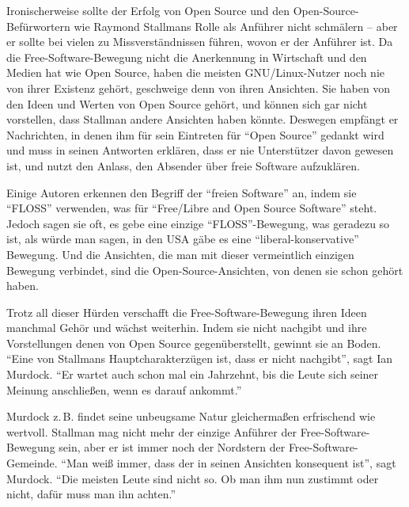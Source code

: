 Ironischerweise sollte der Erfolg von Open Source und den Open-Source-Befürwortern wie Raymond Stallmans Rolle als Anführer nicht schmälern – aber er sollte bei vielen zu Missverständnissen führen, wovon er der Anführer ist. Da die Free-Software-Bewegung nicht die Anerkennung in Wirtschaft und den Medien hat wie Open Source, haben die meisten GNU/Linux-Nutzer noch nie von ihrer Existenz gehört, geschweige denn von ihren Ansichten. Sie haben von den Ideen und Werten von Open Source gehört, und können sich gar nicht vorstellen, dass Stallman andere Ansichten haben könnte. Deswegen empfängt er Nachrichten, in denen ihm für sein Eintreten für "`Open Source"' gedankt wird und muss in seinen Antworten erklären, dass er nie Unterstützer davon gewesen ist, und nutzt den Anlass, den Absender über freie Software aufzuklären.

Einige Autoren erkennen den Begriff der "`freien Software"' an, indem sie "`FLOSS"' verwenden, was für "`Free/Libre and Open Source Software"' steht. Jedoch sagen sie oft, es gebe eine einzige "`FLOSS"'-Bewegung, was geradezu so ist, als würde man sagen, in den USA gäbe es eine "`liberal-konservative"' Bewegung. Und die Ansichten, die man mit dieser vermeintlich einzigen Bewegung verbindet, sind die Open-Source-Ansichten, von denen sie schon gehört haben.

Trotz all dieser Hürden verschafft die Free-Software-Bewegung ihren Ideen manchmal Gehör und wächst weiterhin. Indem sie nicht nachgibt und ihre Vorstellungen denen von Open Source gegenüberstellt, gewinnt sie an Boden. "`Eine von Stallmans Hauptcharakterzügen ist, dass er nicht nachgibt"', sagt Ian Murdock. "`Er wartet auch schon mal ein Jahrzehnt, bis die Leute sich seiner Meinung anschließen, wenn es darauf ankommt."'

Murdock z.\,B. findet seine unbeugsame Natur gleichermaßen erfrischend wie wertvoll. Stallman mag nicht mehr der einzige Anführer der Free-Software-Bewegung sein, aber er ist immer noch der Nordstern der Free-Software-Gemeinde. "`Man weiß immer, dass der in seinen Ansichten konsequent ist"', sagt Murdock. "`Die meisten Leute sind nicht so. Ob man ihm nun zustimmt oder nicht, dafür muss man ihn achten."'
